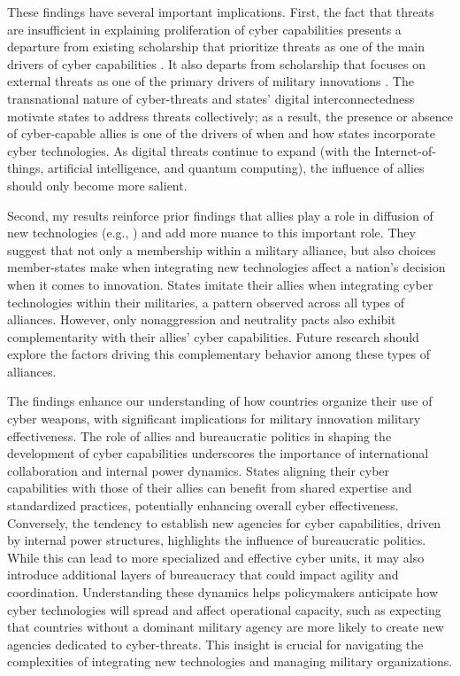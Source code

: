 \documentclass[12pt, letterpaper]{article}
\theoremstyle{plain}
\theoremstyle{remark}
\begin{document}
These findings have several important implications.
First, the fact that threats are insufficient in explaining proliferation of cyber capabilities presents a departure from existing scholarship that prioritize threats as one of the main drivers of cyber capabilities \citep{gomez2016arming, Calderaro2020}. 
It also departs from scholarship that focuses on external threats as one of the primary drivers of military innovations \citep{posen1993nationalism, waltz1979theory, Resende2007}.
The transnational nature of cyber-threats and states' digital interconnectedness motivate states to address threats collectively; as a result, the presence or absence of cyber-capable allies is 
one of the drivers of when and how states incorporate cyber technologies. 
As digital threats continue to expand (with the Internet-of-things, artificial intelligence, and quantum computing), the influence of allies should only become more salient.


Second, my results reinforce prior findings that allies play a role in diffusion of new technologies (e.g., \citep{Kostyuk2024JPR}) and add more nuance to this important role. 
They suggest that not only a membership within a military alliance, but also choices member-states make when integrating new technologies affect a nation's decision when it comes to innovation. 
States imitate their allies when integrating cyber technologies within their militaries, a pattern observed across all types of alliances. However, only nonaggression and neutrality pacts also exhibit complementarity with their allies' cyber capabilities. Future research should explore the factors driving this complementary behavior among these types of alliances.


The findings enhance our understanding of how countries organize their use of cyber weapons, with significant implications for military innovation military effectiveness. The role of allies and bureaucratic politics in shaping the development of cyber capabilities underscores the importance of international collaboration and internal power dynamics. States aligning their cyber capabilities with those of their allies can benefit from shared expertise and standardized practices, potentially enhancing overall cyber effectiveness. Conversely, the tendency to establish new agencies for cyber capabilities, driven by internal power structures, highlights the influence of bureaucratic politics. While this can lead to more specialized and effective cyber units, it may also introduce additional layers of bureaucracy that could impact agility and coordination. Understanding these dynamics helps policymakers anticipate how cyber technologies will spread and affect operational capacity, such as expecting that countries without a dominant military agency are more likely to create new agencies dedicated to cyber-threats. This insight is crucial for navigating the complexities of integrating new technologies and managing military organizations.
\end{document}
